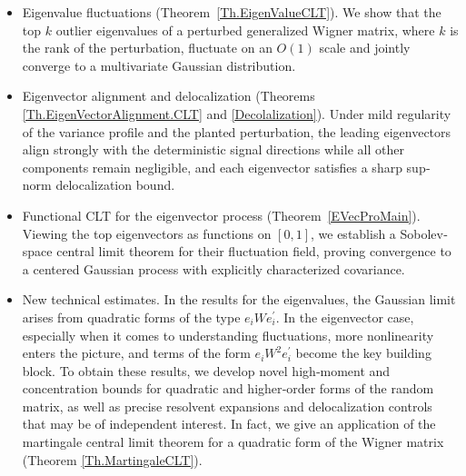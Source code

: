 \documentclass[11pt, reqno]{amsart}
\numberwithin{equation}{section}
\begin{document}
\begin{itemize}
  \item Eigenvalue fluctuations (Theorem~\ref{Th.EigenValueCLT}).  
    We show that the top \(k\) outlier eigenvalues of a perturbed generalized Wigner matrix, where \(k\) is the rank of the perturbation, fluctuate on an \(O(1)\) scale and jointly converge to a multivariate Gaussian distribution.

  \item Eigenvector alignment and delocalization (Theorems \ref{Th.EigenVectorAlignment.CLT} and \ref{Decolalization}). 
    Under mild regularity of the variance profile and the planted perturbation, the leading eigenvectors align strongly with the deterministic signal directions while all other components remain negligible, and each eigenvector satisfies a sharp sup‐norm delocalization bound.

  \item Functional CLT for the eigenvector process (Theorem~\ref{EVecProMain}).
    Viewing the top eigenvectors as functions on \([0,1]\), we establish a Sobolev‐space central limit theorem for their fluctuation field, proving convergence to a centered Gaussian process with explicitly characterized covariance.

  \item New technical estimates.  
   In the results for the eigenvalues, the Gaussian limit arises from quadratic forms of the type $e_iWe_i^\prime$. In the eigenvector case, especially when it comes to understanding fluctuations, more nonlinearity enters the picture, and terms of the form $e_iW^2e_i^\prime$ become the key building block. To obtain these  results, we develop novel high‐moment and concentration bounds for quadratic and higher‐order forms of the random matrix, as well as precise resolvent expansions and delocalization controls that may be of independent interest. In fact, we give an application of the martingale central limit theorem for a quadratic form of the Wigner matrix (Theorem \ref{Th.MartingaleCLT}). 
\end{itemize}
\end{document}
